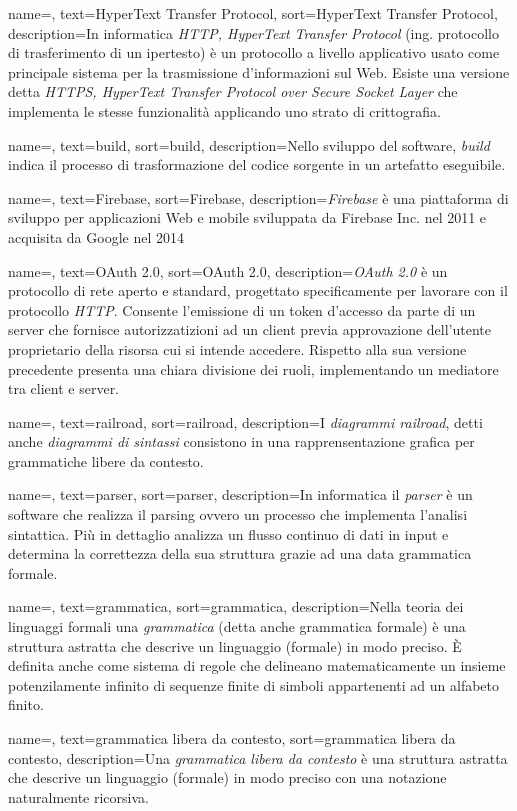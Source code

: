 {
	name=,
	text=HyperText Transfer Protocol,
	sort=HyperText Transfer Protocol,
	description={In informatica \emph{HTTP, HyperText Transfer Protocol} (ing. protocollo di trasferimento di un ipertesto) è un protocollo a livello applicativo usato come principale sistema per la trasmissione d'informazioni sul Web. Esiste una versione detta \emph{HTTPS, HyperText Transfer Protocol over Secure Socket Layer} che implementa le stesse funzionalità applicando uno strato di crittografia.}
}

{
	name=,
	text=build,
	sort=build,
	description={Nello sviluppo del software, \emph{build} indica il processo di trasformazione del codice sorgente in un artefatto eseguibile.}
}

{
	name=,
	text=Firebase,
	sort=Firebase,
	description={\emph{Firebase} è una piattaforma di sviluppo per applicazioni Web e mobile sviluppata da Firebase Inc. nel 2011 e acquisita da Google nel 2014}
}

{
	name=,
	text=OAuth 2.0,
	sort=OAuth 2.0,
	description={\emph{OAuth 2.0} è un protocollo di rete aperto e standard, progettato specificamente per lavorare con il protocollo \emph{HTTP}. Consente l'emissione di un token d'accesso da parte di un server che fornisce autorizzatizioni ad un client previa approvazione dell'utente proprietario della risorsa cui si intende accedere. Rispetto alla sua versione precedente presenta una chiara divisione dei ruoli, implementando un mediatore tra client e server.}
}

{
	name=,
	text=railroad,
	sort=railroad,
	description={I \emph{diagrammi railroad}, detti anche \emph{diagrammi di sintassi} consistono in una rapprensentazione grafica per grammatiche libere da contesto.}
}

{
	name=,
	text=parser,
	sort=parser,
	description={In informatica il \emph{parser} è un software che realizza il parsing ovvero un processo che implementa l'analisi sintattica. Più in dettaglio analizza un flusso continuo di dati in input e determina la correttezza della sua struttura grazie ad una data grammatica formale.}
}

{
	name=,
	text=grammatica,
	sort=grammatica,
	description={Nella teoria dei linguaggi formali una \emph{grammatica} (detta anche grammatica formale) è una struttura astratta che descrive un linguaggio (formale) in modo preciso. È definita anche come sistema di regole che delineano matematicamente un insieme potenzilamente infinito di sequenze finite di simboli appartenenti ad un alfabeto finito.}
}

{
	name=,
	text=grammatica libera da contesto,
	sort=grammatica libera da contesto,
	description={Una \emph{grammatica libera da contesto} è una struttura astratta che descrive un linguaggio (formale) in modo preciso con una notazione naturalmente ricorsiva.}
}
